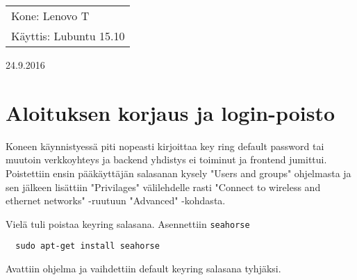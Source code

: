 \documentclass[main.tex]{subfiles}
\begin{document}
\thispagestyle{empty}
\begin{tabular}[t]{l}
Kone: Lenovo T\\
Käyttis: Lubuntu 15.10
\end{tabular}
\hfill 24.9.2016

\section{Aloituksen korjaus ja login-poisto}

Koneen käynnistyessä piti nopeasti kirjoittaa key ring default password tai muutoin verkkoyhteys ja backend yhdistys ei toiminut ja frontend jumittui. Poistettiin ensin pääkäyttäjän salasanan kysely "Users and groups" ohjelmasta ja sen jälkeen lisättiin "Privilages" välilehdelle rasti "Connect to wireless and ethernet networks" -ruutuun "Advanced" -kohdasta.

Vielä tuli poistaa keyring salasana. Asennettiin \texttt{seahorse} 

\begin{lstlisting}
  sudo apt-get install seahorse
\end{lstlisting}

Avattiin ohjelma ja vaihdettiin default keyring salasana tyhjäksi.
\end{document}
